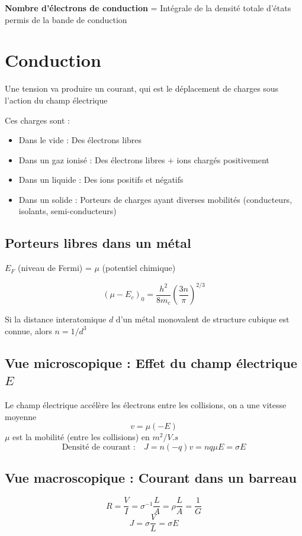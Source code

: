 \documentclass[12pt,a4paper]{article}
\begin{document}
\textbf{Nombre d'électrons de conduction} = Intégrale de la densité totale d'états permis de la bande de conduction


\section{Conduction}

Une tension va produire un courant, qui est le déplacement de charges sous l'action du champ électrique

Ces charges sont :
\begin{itemize}
        \item Dans le vide : Des électrons libres
        \item Dans un gaz ionisé : Des électrons libres + ions chargés positivement
        \item Dans un liquide : Des ions positifs et négatifs
        \item Dans un solide : Porteurs de charges ayant diverses mobilités (conducteurs, isolants, semi-conducteurs)
\end{itemize}

\subsection{Porteurs libres dans un métal}

$E_F$ (niveau de Fermi) = $\mu$ (potentiel chimique)

$$(\mu - E_c)_0 = \frac{h^2}{8m_c}\left(\frac{3n}{\pi}\right)^{2/3}$$

Si la distance interatomique $d$ d'un métal monovalent de structure cubique est connue, alors $n = 1/d^3$

\subsection{Vue microscopique : Effet du champ électrique $E$}

Le champ électrique accélère les électrons entre les collisions, on a une vitesse moyenne
$$v = \mu (-E)$$
$\mu$ est la mobilité (entre les collisions) en $m^2/V.s$
$$\text{Densité de courant :} \quad J = n (-q) v = nq\mu E = \sigma E$$

\subsection{Vue macroscopique :  Courant dans un barreau}

$$R = \frac{V}{I} = \sigma^{-1} \frac{L}{A} = \rho \frac{L}{A} = \frac{1}{G}$$
$$J = \sigma \frac{V}{L} = \sigma E$$
\end{document}
